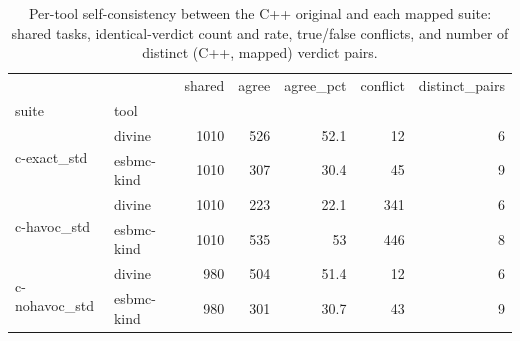 \begin{table}[t]
  \centering
  \caption{Per-tool self-consistency between the C++ original and each mapped suite: shared tasks, identical-verdict count and rate, true/false conflicts, and number of distinct (C++, mapped) verdict pairs.}
  \label{tab:selfpair-summary}
\begin{tabular}{llrrrrr}
\toprule
 &  & shared & agree & agree\_pct & conflict & distinct\_pairs \\
suite & tool &  &  &  &  &  \\
\midrule
\multirow[t]{2}{*}{c-exact\_std} & divine & 1010 & 526 & 52.1 & 12 & 6 \\
 & esbmc-kind & 1010 & 307 & 30.4 & 45 & 9 \\
\cline{1-7}
\multirow[t]{2}{*}{c-havoc\_std} & divine & 1010 & 223 & 22.1 & 341 & 6 \\
 & esbmc-kind & 1010 & 535 & 53 & 446 & 8 \\
\cline{1-7}
\multirow[t]{2}{*}{c-nohavoc\_std} & divine & 980 & 504 & 51.4 & 12 & 6 \\
 & esbmc-kind & 980 & 301 & 30.7 & 43 & 9 \\
\cline{1-7}
\bottomrule
\end{tabular}
\end{table}
